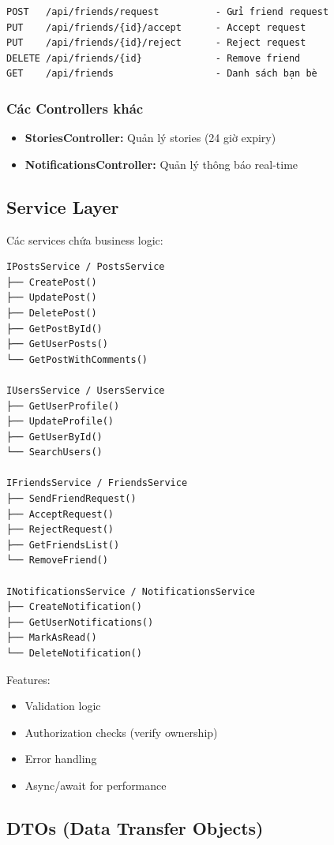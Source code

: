 \begin{verbatim}
POST   /api/friends/request          - Gửi friend request
PUT    /api/friends/{id}/accept      - Accept request
PUT    /api/friends/{id}/reject      - Reject request
DELETE /api/friends/{id}             - Remove friend
GET    /api/friends                  - Danh sách bạn bè
\end{verbatim}

\subsubsection{Các Controllers khác}
\begin{itemize}
    \item \textbf{StoriesController:} Quản lý stories (24 giờ expiry)
    \item \textbf{NotificationsController:} Quản lý thông báo real-time
\end{itemize}

\subsection{Service Layer}

Các services chứa business logic:

\begin{verbatim}
IPostsService / PostsService
├── CreatePost()
├── UpdatePost()
├── DeletePost()
├── GetPostById()
├── GetUserPosts()
└── GetPostWithComments()

IUsersService / UsersService
├── GetUserProfile()
├── UpdateProfile()
├── GetUserById()
└── SearchUsers()

IFriendsService / FriendsService
├── SendFriendRequest()
├── AcceptRequest()
├── RejectRequest()
├── GetFriendsList()
└── RemoveFriend()

INotificationsService / NotificationsService
├── CreateNotification()
├── GetUserNotifications()
├── MarkAsRead()
└── DeleteNotification()
\end{verbatim}

Features:
\begin{itemize}
    \item Validation logic
    \item Authorization checks (verify ownership)
    \item Error handling
    \item Async/await for performance
\end{itemize}

\subsection{DTOs (Data Transfer Objects)}

